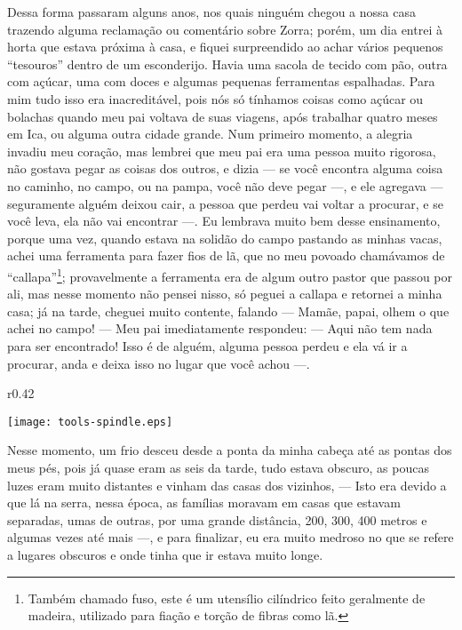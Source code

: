 Dessa forma passaram alguns anos, nos quais ninguém chegou a nossa casa trazendo alguma reclamação ou comentário sobre Zorra; porém, um dia entrei à horta que estava próxima à casa, e fiquei surpreendido ao achar vários pequenos ``tesouros'' dentro de um esconderijo. Havia uma sacola de tecido com pão, outra com açúcar, uma com doces e algumas pequenas ferramentas espalhadas. 
Para mim tudo isso era inacreditável, pois nós só tínhamos coisas como açúcar ou bolachas quando meu pai voltava de suas viagens, após trabalhar quatro meses em Ica, ou alguma outra cidade grande.
Num primeiro momento, a alegria invadiu meu coração, mas lembrei que meu pai era uma pessoa muito rigorosa, não gostava pegar as coisas dos outros, e dizia --- se você encontra alguma coisa no caminho, no campo, ou na pampa, você não deve pegar ---, e ele agregava --- seguramente alguém deixou cair, a pessoa que perdeu vai voltar a procurar, e se você leva, ela não vai encontrar ---. 
Eu lembrava muito bem desse ensinamento, porque uma vez, quando estava na solidão do campo pastando as minhas vacas, achei uma ferramenta para fazer fios de lã, que no meu povoado chamávamos de ``callapa''\footnote{Também chamado fuso, este é um utensílio cilíndrico feito geralmente de madeira, utilizado para fiação e torção de fibras como lã.}; provavelmente a ferramenta era de algum outro pastor que passou por ali, mas nesse momento não pensei nisso, só peguei a callapa e retornei a minha casa; já na tarde, cheguei  muito contente, falando --- Mamãe, papai, olhem o que achei no campo! --- 
Meu pai imediatamente respondeu: --- Aqui não tem nada para ser encontrado! Isso é de alguém, alguma pessoa perdeu e ela vá ir a procurar, anda e deixa isso no lugar que você achou ---. 
\begin{wrapfigure}{r}{0.42\textwidth}
  \begin{center}
  \vspace{-10pt}
    \texttt{[image: tools-spindle.eps]}
  \end{center}
  \vspace{-20pt}
\end{wrapfigure}
Nesse momento, um frio desceu desde a ponta da minha cabeça até as pontas dos meus pés, pois já quase eram as seis da tarde, tudo estava obscuro, as poucas luzes eram muito distantes e vinham das casas dos vizinhos, --- Isto era devido a que lá na serra, nessa época, as famílias moravam em casas que estavam separadas, umas de outras, por uma grande distância, 200, 300, 400 metros e algumas vezes até mais  ---, e para finalizar, eu era muito medroso no que se refere a lugares obscuros e onde tinha que ir estava muito longe.

